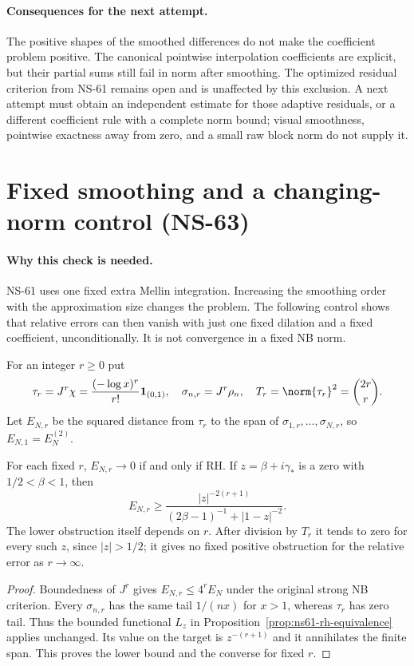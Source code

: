 \paragraph{Consequences for the next attempt.}
The positive shapes of the smoothed differences do not make the
coefficient problem positive. The canonical pointwise interpolation
coefficients are explicit, but their partial sums still fail in norm
after smoothing. The optimized residual criterion from NS-61 remains
open and is unaffected by this exclusion. A next attempt must obtain
an independent estimate for those adaptive residuals, or a different
coefficient rule with a complete norm bound; visual smoothness,
pointwise exactness away from zero, and a small raw block norm do not
supply it.

\section{Fixed smoothing and a changing-norm control (NS-63)}
\label{sec:ns63-changing-norm}

\paragraph{Why this check is needed.}
NS-61 uses one fixed extra Mellin integration. Increasing the smoothing
order with the approximation size changes the problem. The following
control shows that relative errors can then vanish with just one fixed
dilation and a fixed coefficient, unconditionally. It is not convergence
in a fixed NB norm.

For an integer $r\geq0$ put
\[
 \tau_r=J^r\chi=\frac{(-\log x)^r}{r!}\mathbf1_{(0,1)},\quad
 \sigma_{n,r}=J^r\rho_n,\quad
 T_r=\norm{\tau_r}^2=\binom{2r}{r}.
\]
Let $E_{N,r}$ be the squared distance from $\tau_r$ to the span of
$\sigma_{1,r},\ldots,\sigma_{N,r}$, so $E_{N,1}=E_N^{(2)}$.

\begin{proposition}
\label{prop:ns63-fixed-order}
For each fixed $r$, $E_{N,r}\to0$ if and only if RH. If
$z=\beta+i\gamma_*$ is a zero with $1/2<\beta<1$, then
\[
 E_{N,r}\geq
 \frac{|z|^{-2(r+1)}}{(2\beta-1)^{-1}+|1-z|^{-2}}.
\]
The lower obstruction itself depends on $r$. After division by $T_r$
it tends to zero for every such $z$, since $|z|>1/2$; it gives no
fixed positive obstruction for the relative error as $r\to\infty$.
\end{proposition}
\begin{proof}
Boundedness of $J^r$ gives $E_{N,r}\leq4^rE_N$ under the original
strong NB criterion. Every $\sigma_{n,r}$ has the same tail $1/(nx)$
for $x>1$, whereas $\tau_r$ has zero tail. Thus the bounded functional
$L_z$ in Proposition~\ref{prop:ns61-rh-equivalence} applies unchanged.
Its value on the target is $z^{-(r+1)}$ and it annihilates the finite
span. This proves the lower bound and the converse for fixed $r$.
\end{proof}

